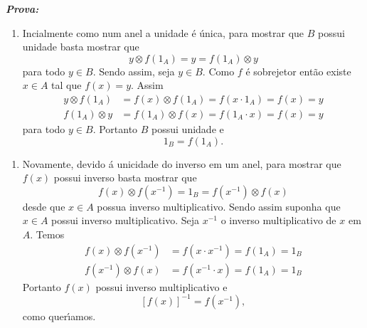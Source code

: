 \documentclass{beamer}
\begin{document}
    \begin{frame}
        \noindent \textbf{\textit{Prova: }}
        \begin{enumerate}[label={\roman*})]
            \item Incialmente como num anel a unidade \'e \'unica, para mostrar que $B$ possui unidade basta mostrar que
            \[
                y\otimes f(1_A) = y = f(1_A)\otimes y
            \]
            para todo $y \in B$. Sendo assim, seja $y \in B$. Como $f$ \'e sobrejetor ent\~ao existe $x \in A$ tal que $f(x) = y$. Assim
            \begin{align*}
                y\otimes f(1_A) &= f(x) \otimes f(1_A) = f(x\cdot 1_A) = f(x) = y\\
                f(1_A)\otimes y &= f(1_A) \otimes f(x) = f(1_A\cdot x) = f(x) = y
            \end{align*}
            para todo $y \in B$. Portanto $B$ possui unidade e
            \[
                1_B = f(1_A).
            \]

            \seti
        \end{enumerate}
    \end{frame}

    \begin{frame}
        \begin{enumerate}[label={\roman*})]
            \conti

            \item Novamente, devido \'a unicidade do inverso em um anel, para mostrar que $f(x)$ possui inverso basta mostrar que
            \[
                f(x)\otimes f(x^{-1}) = 1_B = f(x^{-1})\otimes f(x)
            \]
            desde que $x \in A$ possua inverso multiplicativo. Sendo assim suponha que $x \in A$ possui inverso multiplicativo. Seja $x^{-1}$ o inverso multiplicativo de $x$ em $A$. Temos
            \begin{align*}
                f(x)\otimes f(x^{-1}) &= f(x\cdot x^{-1}) = f(1_A) = 1_B\\
                f(x^{-1})\otimes f(x) &= f(x^{-1}\cdot x) = f(1_A) = 1_B
            \end{align*}
            Portanto $f(x)$ possui inverso multiplicativo e
            \[
                [f(x)]^{-1} = f(x^{-1}),
            \]
            como quer{\'\i}amos. \hspace{.5cm} \qedsymbol
        \end{enumerate}
    \end{frame}
\end{document}
